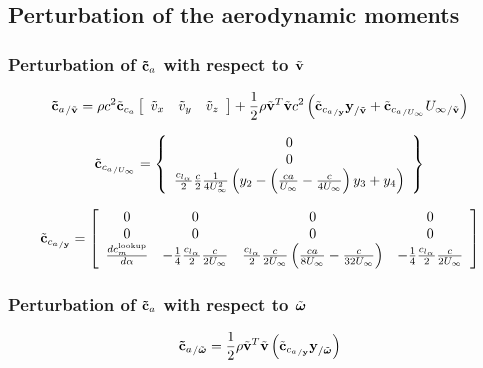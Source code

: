 \subsection{Perturbation of the aerodynamic moments}
\subsubsection{Perturbation of $\bm{\mathbf{\tilde{c}}}_a$ with respect to $\tilde{\bm{\mathbf{v}}}$}
		
\begin{equation}
{\bm{\mathbf{\tilde{c}}}_a}_{/\tilde{\bm{\mathbf{v}}}} = 
	\rho c^2 \tilde{\bm{\mathbf{c}}}_{c_{a}} \left[
		\begin{array}{ccc}
			\tilde{v}_x & \tilde{v}_y & \tilde{v}_z
		\end{array} \right] +
	\frac{1}{2} \rho \tilde{\bm{\mathbf{v}}}^T \tilde{\bm{\mathbf{v}}} c^2
	\left(  \tilde{\bm{\mathbf{c}}}_{{c_{a}}_{/\bm{\mathbf{y}}}} \bm{\mathbf{y}}_{/\tilde{\bm{\mathbf{v}}}} + 
	\tilde{\bm{\mathbf{c}}}_{{c_{a}}_{/U_{\infty}}} {U_\infty}_{/\tilde{\bm{\mathbf{v}}}}  \right) 
\end{equation}

\begin{equation}
\tilde{\bm{\mathbf{c}}}_{{c_{a}}_{/U_{\infty}}} = \left\{
	\begin{array}{c}
		0 \\
		0 \\
		\frac{c_{l_{\alpha}}}{2} \frac{c}{2} \frac{1}{4 U_\infty^2} 
		\left(  y_2 - \left(  \frac{c a}{U_\infty} - \frac{c}{4 U_\infty}  \right) y_3 +y_4 \right)
	\end{array} \right\}
\end{equation}

\begin{equation}
\tilde{\bm{\mathbf{c}}}_{{c_{a}}_{/\bm{\mathbf{y}}}} = \left[
	\begin{array}{cccc}
		0 & 0 & 0 & 0 \\
		0 & 0 & 0 & 0 \\
		\frac{ d c_m^{\text{lookup}}}{d \alpha} & 
			-\frac{1}{4} \frac{c_{l_{\alpha}}}{2} \frac{c}{2 U_\infty} &
			\frac{c_{l_{\alpha}}}{2} \frac{c}{2 U_\infty} \left(  \frac{c a}{8 U_\infty} -\frac{c}{32 U_\infty} \right) &
			-\frac{1}{4} \frac{c_{l_{\alpha}}}{2} \frac{c}{2 U_\infty} 
	\end{array} \right]
\end{equation}
\subsubsection{Perturbation of $\bm{\mathbf{\tilde{c}}}_a$ with respect to $\tilde{\bm{\mathbf{\omega}}}$}
\begin{equation}
{\bm{\mathbf{\tilde{c}}}_a}_{/\tilde{\bm{\mathbf{\omega}}}} = 
	\frac{1}{2} \rho \tilde{\bm{\mathbf{v}}}^T \tilde{\bm{\mathbf{v}}} 
	\left(  \tilde{\bm{\mathbf{c}}}_{{c_{a}}_{/\bm{\mathbf{y}}}} \bm{\mathbf{y}}_{/\tilde{\bm{\mathbf{\omega}}}}  \right) 
\end{equation}

